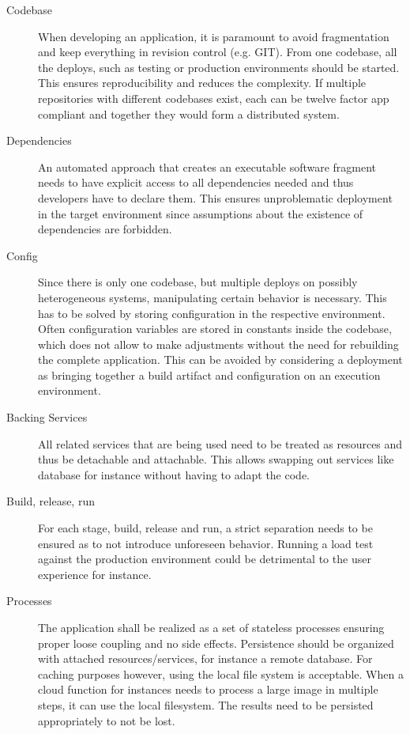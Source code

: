 \setlength{\leftmargini}{0pt} 
\begin{description}
	\item[Codebase] When developing an application, it is paramount to avoid fragmentation and keep everything in revision control (e.g. GIT). From one codebase, all the deploys, such as testing or production environments should be started. This ensures reproducibility and reduces the complexity. If multiple repositories with different codebases exist, each can be twelve factor app compliant and together they would form a distributed system.
	\item[Dependencies] An automated approach that creates an executable software fragment needs to have explicit access to all dependencies needed and thus developers have to declare them. This ensures unproblematic deployment in the target environment since assumptions about the existence of dependencies are forbidden. 
	\item[Config] Since there is only one codebase, but multiple deploys on possibly heterogeneous systems, manipulating certain behavior is necessary. This has to be solved by storing configuration in the respective environment. Often configuration variables are stored in constants inside the codebase, which does not allow to make adjustments without the need for rebuilding the complete application. This can be avoided by considering a deployment as bringing together a build artifact and configuration on an execution environment.
	\item[Backing Services] All related services that are being used need to be treated as resources and thus be detachable and attachable. This allows swapping out services like database for instance without having to adapt the code. 
	\item[Build, release, run] For each stage, build, release and run, a strict separation needs to be ensured as to not introduce unforeseen behavior. Running a load test against the production environment could be detrimental to the user experience for instance. 
	\item[Processes] The application shall be realized as a set of stateless processes ensuring proper loose coupling and no side effects. Persistence should be organized with attached resources/services, for instance a remote database. For caching purposes however, using the local file system is acceptable. When a cloud function for instances needs to process a large image in multiple steps, it can use the local filesystem. The results need to be persisted appropriately to not be lost.

\end{description}
